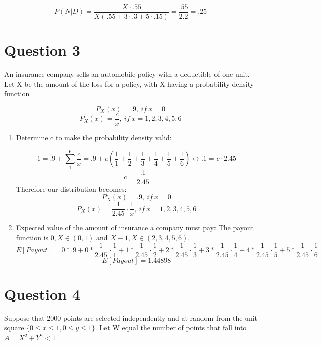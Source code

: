 \documentclass[svgnames]{article}
\begin{document}
$$P(N|D) = \frac{X \cdot .55}{X(.55 + 3\cdot .3 + 5\cdot .15)}= \frac{.55}{2.2}=.25$$


\section{Question 3}
 An insurance company sells an automobile policy with a deductible of one unit. Let X be the
amount of the loss for a policy, with X having a probability density function

$$P_{X}(x) = .9,\ if\ x = 0$$
$$P_{X}(x) = \frac{c}{x},\ if\ x = 1,2,3,4,5,6$$

\begin{enumerate}[label = (\alph*)]
\item
Determine c to make the probability density valid:

$$1 = .9 + \sum_{1}^{6}\frac{c}{x} = .9 + c(\frac{1}{1}+\frac{1}{2}+\frac{1}{3}+\frac{1}{4}+\frac{1}{5}+\frac{1}{6})\leftrightarrow .1 =  c \cdot 2.45  $$
 $$  c = \frac{.1}{2.45}$$
 \newline
 \newline
Therefore our distribution becomes:
$$P_{X}(x) = .9,\ if\ x = 0$$
$$P_{X}(x) = \frac{1}{2.45}\cdot \frac{1}{x},\ if\ x = 1,2,3,4,5,6$$

 
\item 
Expected value of the amount of insurance a company must pay:
\newline
\newline
 The payout function is $0 , X\in(0,1)$ and $X-1, X \in (2,3,4,5,6)$.
 \newline
 \newline
 $$E[Payout] = 0*.9 + 0*\frac{1}{2.45}\cdot \frac{1}{1}+1*\frac{1}{2.45}\cdot \frac{1}{2}+2*\frac{1}{2.45}\cdot \frac{1}{3}+3*\frac{1}{2.45}\cdot \frac{1}{4}+4*\frac{1}{2.45}\cdot \frac{1}{5}+5*\frac{1}{2.45}\cdot \frac{1}{6}$$
 $$E[Payout]  = 1.44898 $$

\end{enumerate}


\section{Question 4}
 Suppose that 2000 points are selected independently and at random from the unit square
$\{0\leq x \leq1,0\leq y\leq1\}$. Let W equal the number of points that fall into $A = X^2 +Y^2 <1$
\end{document}
